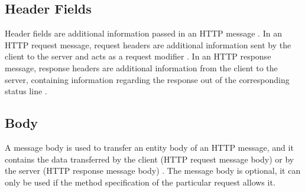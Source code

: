    \subsection{Header Fields}

      Header fields are additional information passed in an HTTP message \autocite[\enquote{4.2 Message Headers}]{http-rfc}. In an HTTP request message, request headers are additional information sent by the client to the server and acts as a request modifier \autocite[\enquote{5.3 Request Header Fields}]{http-rfc}. In an HTTP response message, response headers are additional information from the client to the server, containing information regarding the response out of the corresponding status line \autocite[\enquote{6.2 Response Header Fields}]{http-rfc}.

    \subsection{Body}
    
      A message body is used to transfer an entity body of an HTTP message, and it contains the data transferred by the client (HTTP request message body) or by the server (HTTP response message body) \autocite[\enquote{Message Body}]{http-rfc}. The message body is optional, it can only be used if the method specification of the particular request allows it. 

